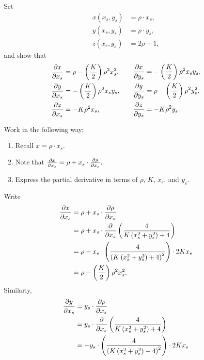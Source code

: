\documentclass{ximera}
\begin{document}
\begin{problem}
  Set
  \begin{align*}
    x(x_s,y_s) &=\rho\cdot x_s,\\
    y(x_s,y_s) &=\rho\cdot y_s,\\
    z(x_s,y_s) &=2\rho-1,
  \end{align*}
  and show that
  \[
  \begin{split}
    \pp[x]{x_s} &=\rho-\left(\frac{K}{2}\right)\rho^2x_s^2,\\
    \pp[y]{x_s} &=-\left(\frac{K}{2}\right)\rho^2x_sy_s,\\
    \pp[z]{x_s} &=-K\rho^2x_s,
  \end{split}
  \qquad
  \begin{split}
    \pp[x]{y_s} &= -\left(\frac{K}{2}\right)\rho^2x_sy_s,\\
    \pp[y]{y_s} &=\rho-\left(\frac{K}{2}\right)\rho^2y_s^2,\\
    \pp[z]{y_s} &= -K\rho^2y_s.
  \end{split}
  \]
  \begin{hint}
  Work in the following way:
  \begin{enumerate}
  \item Recall $x = \rho\cdot x_s$.
  \item Note that $\pp[x]{x_s} = \rho + x_s \cdot \pp[\rho]{x_s}$.
  \item Express the partial derivative in terms of $\rho$, $K$, $x_s$,
      and $y_s$.
  \end{enumerate}
  \end{hint}
  \begin{freeResponse}
    Write
    \begin{align*}
      \pp[x]{x_s} &= \rho + x_s\cdot \pp[\rho]{x_s}\\
      &= \rho + x_s\cdot \pp{x_s}\left(\frac{4}{K\left(x_s^2 + y_s^2\right) + 4}\right)\\
      &= \rho - x_s\cdot \left(\frac{4}{\left(K\left(x_s^2 + y_s^2\right) + 4\right)^{2}}\right)\cdot2Kx_s \\
      &=\rho-\left(\frac{K}{2}\right)\rho^2x_s^2.
    \end{align*}
    Similarly,
      \begin{align*}
      \pp[y]{x_s} &= y_s\cdot \pp[\rho]{x_s}\\
      &= y_s\cdot \pp{x_s}\left(\frac{4}{K\left(x_s^2 + y_s^2\right) + 4}\right)\\
      &= - y_s\cdot \left(\frac{4}{\left(K\left(x_s^2 + y_s^2\right) + 4\right)^{2}}\right)\cdot2Kx_s \\

\end{align*}
\end{freeResponse}
\end{problem}
\end{document}
